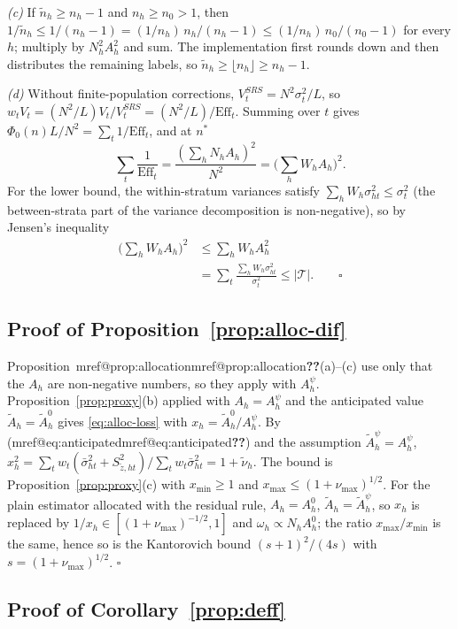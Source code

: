 \documentclass[pdflatex,sn-mathphys-num,iicol]{sn-jnl}
\makeatletter
\theoremstyle{thmstyleone}
\theoremstyle{thmstyletwo}
\theoremstyle{thmstylethree}
\newcommand{\Mref}[1]{\ifcsname mref@#1\endcsname\csname mref@#1\endcsname\else\textbf{??}\fi}
\makeatother
\begin{document}
\emph{(c)} If $\tilde n_h\ge n_h-1$ and $n_h\ge n_0>1$, then
$1/\tilde n_h\le1/(n_h-1)=(1/n_h)\,n_h/(n_h-1)\le(1/n_h)\,n_0/(n_0-1)$ for every $h$; multiply by
$N_h^2A_h^2$ and sum. The implementation first rounds down and then distributes the remaining
labels, so $\tilde n_h\ge\lfloor n_h\rfloor\ge n_h-1$.

\emph{(d)} Without finite-population corrections, $V^{SRS}_t=N^2\sigma^2_t/L$, so
$w_tV_t=(N^2/L)V_t/V^{SRS}_t=(N^2/L)/\mathrm{Eff}_t$. Summing over $t$ gives
$\Phi_0(n)L/N^2=\sum_t1/\mathrm{Eff}_t$, and at $n^\ast$
\[
\sum_t\frac{1}{\mathrm{Eff}_t}=\frac{(\sum_hN_hA_h)^2}{N^2}=\Big(\sum_hW_hA_h\Big)^2 .
\] For the lower bound, the
within-stratum variances satisfy $\sum_hW_h\sigma^2_{ht}\le\sigma^2_t$ (the between-strata part of
the variance decomposition is non-negative), so by Jensen's inequality
\begin{align*}
\Big(\sum_hW_hA_h\Big)^2&\le\sum_hW_hA_h^2\\
&=\sum_t\frac{\sum_hW_h\sigma^2_{ht}}{\sigma^2_t}\le|\mathcal T| .\qquad\square
\end{align*}

\subsection{Proof of Proposition~\ref{prop:alloc-dif}}

Proposition~\Mref{prop:allocation}(a)--(c) use only that the $A_h$ are non-negative numbers, so they apply with $A^\psi_h$. Proposition~\ref{prop:proxy}(b) applied with $A_h=A^\psi_h$ and the anticipated
value $\tilde A_h=\tilde A^0_h$ gives \eqref{eq:alloc-loss} with $x_h=\tilde A^0_h/A^\psi_h$. By (\Mref{eq:anticipated}) and the assumption $\tilde A^\psi_h=A^\psi_h$,
$x_h^2=\sum_tw_t(\bar\sigma^2_{ht}+S^2_{\tilde z,ht})/\sum_tw_t\bar\sigma^2_{ht}=1+\tilde\nu_h$. The bound is Proposition~\ref{prop:proxy}(c) with $x_{\min}\ge1$ and $x_{\max}\le(1+\nu_{\max})^{1/2}$.
For the plain estimator allocated with the residual rule, $A_h=A^0_h$, $\tilde A_h=\tilde A^\psi_h$, so $x_h$ is replaced by $1/x_h\in[(1+\nu_{\max})^{-1/2},1]$ and
$\omega_h\propto N_hA^0_h$; the ratio $x_{\max}/x_{\min}$ is the same, hence so is the Kantorovich bound $(s+1)^2/(4s)$ with $s=(1+\nu_{\max})^{1/2}$. $\square$

\subsection{Proof of Corollary~\ref{prop:deff}}
\end{document}
